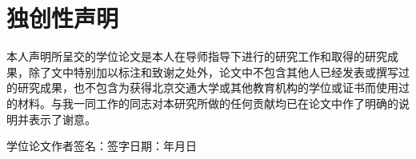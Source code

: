 \chapter*{独创性声明}

{\songti {}\setlength{\baselineskip}{16bp}
	本人声明所呈交的学位论文是本人在导师指导下进行的研究工作和取得的研究成果，除了文中特别加以标注和致谢之处外，论文中不包含其他人已经发表或撰写过的研究成果，也不包含为获得北京交通大学或其他教育机构的学位或证书而使用过的材料。与我一同工作的同志对本研究所做的任何贡献均已在论文中作了明确的说明并表示了谢意。

	\vspace*{3em}
	学位论文作者签名：\hfill 签字日期：\hspace*{4em}年\hspace*{2em}月\hspace*{2em}日

}